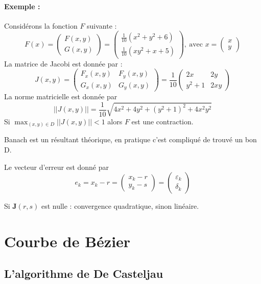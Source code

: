 \documentclass[a4paper,9pt]{extarticle}
\newcommand{\matd}[4]{\begin{pmatrix}#1 & #2 \\ #3 & #4\end{pmatrix}}
\newcommand{\matdd}[2]{\begin{pmatrix}#1 \\ #2\end{pmatrix}}
\begin{document}
\begin{multicols*}{2}
\paragraph*{Exemple :}

Considérons la fonction $F$ suivante :
$$
F(x)= \matdd{F(x,y)}{G(x,y)} = \matdd{\frac{1}{10}(x^2+y^2+6)}{\frac{1}{10}(xy^2+x+5)}, \ \text{avec } x=\matdd{x}{y}
$$
La matrice de Jacobi est donnée par :
$$
J(x,y)=\matd{F_x(x,y)}{F_y(x,y)}{G_x(x,y)}{G_y(x,y)} = \frac{1}{10}\matd{2x}{2y}{y^2+1}{2xy}
$$
La norme matricielle est donnée par
$$
||J(x,y)||=\frac{1}{10}\sqrt{4x^2+4y^2+(y^2+1)^2+4x^2y^2}
$$
Si $\max_{(x,y)\in D}||J(x,y)||<1$ alors $F$ est une contraction.

Banach est un résultant théorique, en pratique c'est compliqué de trouvé un bon D.

Le vecteur d'erreur est donné par
$$
e_k = x_k - r = (\begin{array}{c}
x_k-r \\ 
y_k-s
\end{array} ) = (\begin{matrix}
\varepsilon_k \\ 
\delta_k
\end{matrix})
$$

Si $\textbf{J}(r,s)$ est nulle : convergence quadratique, sinon linéaire.

\section{Courbe de Bézier}
\subsection{L'algorithme de De Casteljau}

\end{multicols*}
\end{document}
